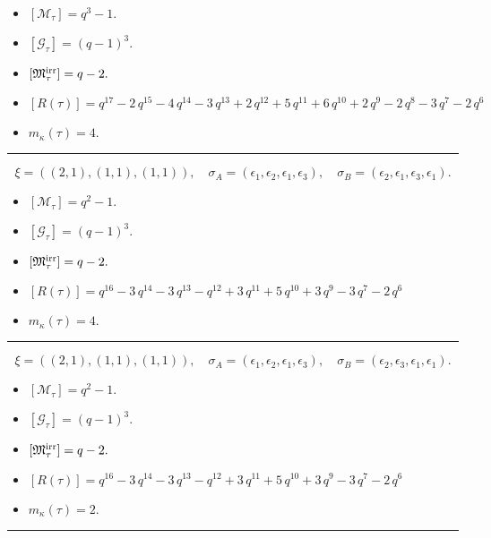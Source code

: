 \documentclass[10pt,a4paper]{amsart}
\begin{document}
\begin{itemize}
 \item $[\mathcal{M}_{\tau}] = q^{3} - 1 .$

 \item $[\mathcal{G}_{\tau}] = {\left(q - 1\right)}^{3} .$

 \item $[{\frak M}_{\tau}^{\textrm{irr}}] = q - 2 .$

 \item $[R(\tau)] = q^{17} - 2 \, q^{15} - 4 \, q^{14} - 3 \, q^{13} + 2 \, q^{12} + 5 \, q^{11} + 6 \, q^{10} + 2 \, q^{9} - 2 \, q^{8} - 3 \, q^{7} - 2 \, q^{6} $

 \item $m_{\kappa}(\tau) = 4 .$

 \end{itemize}
\noindent\rule{8cm}{0.4pt}

$$\xi = ({(2, 1), (1, 1)}, {(1, 1)}),\quad \sigma_A = ({{\epsilon_1, \epsilon_2}, {\epsilon_1}}, {{\epsilon_3}}),\quad \sigma_B = ({{\epsilon_2, \epsilon_1}, {\epsilon_3}}, {{\epsilon_1}}).$$

\begin{itemize}
 \item $[\mathcal{M}_{\tau}] = q^{2} - 1 .$

 \item $[\mathcal{G}_{\tau}] = {\left(q - 1\right)}^{3} .$

 \item $[{\frak M}_{\tau}^{\textrm{irr}}] = q - 2 .$

 \item $[R(\tau)] = q^{16} - 3 \, q^{14} - 3 \, q^{13} - q^{12} + 3 \, q^{11} + 5 \, q^{10} + 3 \, q^{9} - 3 \, q^{7} - 2 \, q^{6} $

 \item $m_{\kappa}(\tau) = 4 .$

 \end{itemize}
\noindent\rule{8cm}{0.4pt}

$$\xi = ({(2, 1), (1, 1)}, {(1, 1)}),\quad \sigma_A = ({{\epsilon_1, \epsilon_2}, {\epsilon_1}}, {{\epsilon_3}}),\quad \sigma_B = ({{\epsilon_2, \epsilon_3}, {\epsilon_1}}, {{\epsilon_1}}).$$

\begin{itemize}
 \item $[\mathcal{M}_{\tau}] = q^{2} - 1 .$

 \item $[\mathcal{G}_{\tau}] = {\left(q - 1\right)}^{3} .$

 \item $[{\frak M}_{\tau}^{\textrm{irr}}] = q - 2 .$

 \item $[R(\tau)] = q^{16} - 3 \, q^{14} - 3 \, q^{13} - q^{12} + 3 \, q^{11} + 5 \, q^{10} + 3 \, q^{9} - 3 \, q^{7} - 2 \, q^{6} $

 \item $m_{\kappa}(\tau) = 2 .$

 \end{itemize}
\noindent\rule{8cm}{0.4pt}
\end{document}

